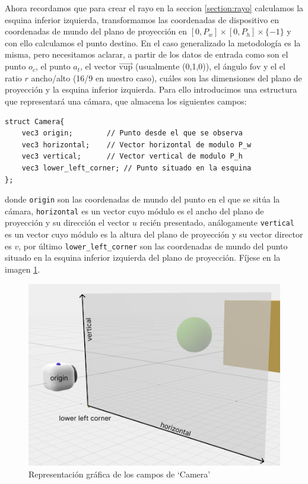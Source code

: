Ahora recordamos que para crear el rayo en la seccion \ref{section:rayo} calculamos la esquina inferior izquierda, transformamos las coordenadas de dispositivo en coordenadas de mundo del plano de proyección en $[0,P_w]\times[0,P_h]\times\{-1\}$ y con ello calculamos el punto destino. En el caso generalizado la metodología es la misma, pero necesitamos aclarar, a partir de los datos de entrada como son el punto $o_c$, el punto $a_t$, el vector $\overrightarrow{\mathrm{vup}}$ (usualmente (0,1,0)), el ángulo $\widehat{\mathrm{fov}}$ y el el ratio $r$ ancho/alto (16/9 en nuestro caso), cuáles son las dimensiones del plano de proyección y la esquina inferior izquierda. Para ello introducimos una estructura que representará una cámara, que almacena los siguientes campos:

\begin{lstlisting}
struct Camera{
    vec3 origin;        // Punto desde el que se observa
    vec3 horizontal;    // Vector horizontal de modulo P_w
    vec3 vertical;      // Vector vertical de modulo P_h
    vec3 lower_left_corner; // Punto situado en la esquina
};
\end{lstlisting}
donde \verb|origin| son las coordenadas de mundo del punto en el que se sitúa la cámara, \verb|horizontal| es un vector cuyo módulo es el ancho del plano de proyección y su dirección el vector $u$ recién presentado, análogamente \verb|vertical| es un vector cuyo módulo es la altura del plano de proyección y su vector director es $v$, por último \verb|lower_left_corner| son las coordenadas de mundo del punto situado en la esquina inferior izquierda del plano de proyección. Fíjese en la imagen \ref{fig:camera-fields}.

\begin{figure} [ht]
    \centering
    \includegraphics[scale = 0.3]{img/C8/camera-fields.png}
    \caption{Representación gráfica de los campos de `Camera'}
    \label{fig:camera-fields}
\end{figure}


